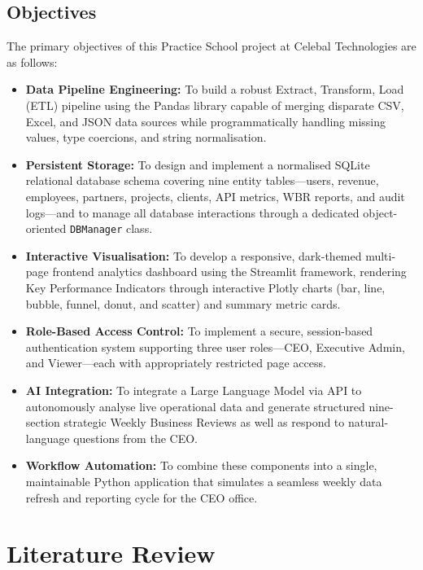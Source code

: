 \documentclass{book}
\begin{document}
\section{Objectives}
The primary objectives of this Practice School project at Celebal Technologies are as follows:
\begin{itemize}
    \item \textbf{Data Pipeline Engineering:} To build a robust Extract, Transform, Load (ETL) pipeline using the Pandas library capable of merging disparate CSV, Excel, and JSON data sources while programmatically handling missing values, type coercions, and string normalisation.
    \item \textbf{Persistent Storage:} To design and implement a normalised SQLite relational database schema covering nine entity tables---users, revenue, employees, partners, projects, clients, API metrics, WBR reports, and audit logs---and to manage all database interactions through a dedicated object-oriented \texttt{DBManager} class.
    \item \textbf{Interactive Visualisation:} To develop a responsive, dark-themed multi-page frontend analytics dashboard using the Streamlit framework, rendering Key Performance Indicators through interactive Plotly charts (bar, line, bubble, funnel, donut, and scatter) and summary metric cards.
    \item \textbf{Role-Based Access Control:} To implement a secure, session-based authentication system supporting three user roles---CEO, Executive Admin, and Viewer---each with appropriately restricted page access.
    \item \textbf{AI Integration:} To integrate a Large Language Model via API to autonomously analyse live operational data and generate structured nine-section strategic Weekly Business Reviews as well as respond to natural-language questions from the CEO.
    \item \textbf{Workflow Automation:} To combine these components into a single, maintainable Python application that simulates a seamless weekly data refresh and reporting cycle for the CEO office.
\end{itemize}




\chapter{Literature Review}
\end{document}
